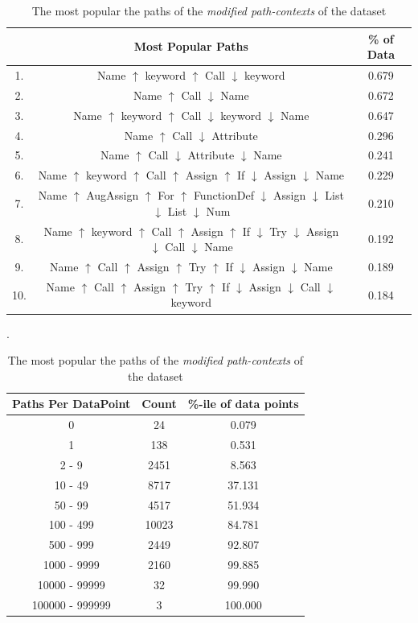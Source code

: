 \begin{table}[p]
    \centering
    \begin{tabular}{c | c | c}       
    
           & Most Popular Paths  &  \% of Data \\  
        \hline
                
        1.  & Name $\uparrow$ keyword $\uparrow$ Call $\downarrow$ keyword &  0.679 \\ 
        2.  & Name $\uparrow$ Call $\downarrow$ Name &  0.672 \\ 
        3.  & Name $\uparrow$ keyword $\uparrow$ Call $\downarrow$ keyword $\downarrow$ Name &  0.647 \\ 
        4.  & Name $\uparrow$ Call $\downarrow$ Attribute &  0.296 \\ 
        5.  & Name $\uparrow$ Call $\downarrow$ Attribute $\downarrow$ Name &  0.241 \\ 
        6.  & Name $\uparrow$ keyword $\uparrow$ Call $\uparrow$ Assign $\uparrow$ If $\downarrow$ Assign $\downarrow$ Name &  0.229 \\ 
        7.  & Name $\uparrow$ AugAssign $\uparrow$ For $\uparrow$ FunctionDef $\downarrow$ Assign $\downarrow$ List $\downarrow$ List $\downarrow$ Num &  0.210 \\ 
        8.  & Name $\uparrow$ keyword $\uparrow$ Call $\uparrow$ Assign $\uparrow$ If $\downarrow$ Try $\downarrow$ Assign $\downarrow$ Call $\downarrow$ Name &  0.192 \\ 
        9.  & Name $\uparrow$ Call $\uparrow$ Assign $\uparrow$ Try $\uparrow$ If $\downarrow$ Assign $\downarrow$ Name &  0.189 \\ 
        10.  & Name $\uparrow$ Call $\uparrow$ Assign $\uparrow$ Try $\uparrow$ If $\downarrow$ Assign $\downarrow$ Call $\downarrow$ keyword &  0.184 \\ 
  
    \end{tabular}
    \caption { The most popular the paths of the \textit{modified path-contexts} of the dataset}.  
    \begin{tabular}{c | c | c  }       
    
        Paths Per DataPoint & Count  &  \%-ile of data points \\  
        \hline
        0 &               24  &     0.079 \\
        1 &               138  &    0.531 \\
        2 - 9 &           2451  &   8.563 \\
        10 - 49 &         8717  &   37.131 \\
        50 - 99 &         4517  &   51.934 \\
        100 - 499 &       10023  &  84.781 \\
        500 - 999 &       2449  &   92.807 \\
        1000 - 9999 &     2160  &   99.885 \\
        10000 - 99999 &   32  &     99.990 \\
        100000 - 999999 & 3  &      100.000 \\


\end{tabular}
\end{table}
